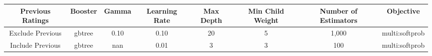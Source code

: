 \footnotesize
\begin{tabular}{cccccccc}
\toprule
Previous Ratings & Booster & Gamma & Learning Rate & Max Depth & Min Child Weight & Number of Estimators & Objective \\
\midrule
Exclude Previous & gbtree & 0.10 & 0.10 & 20 & 5 & 1,000 & multi:softprob \\
Include Previous & gbtree & nan & 0.01 & 3 & 3 & 100 & multi:softprob \\
\bottomrule
\end{tabular}

\normalsize